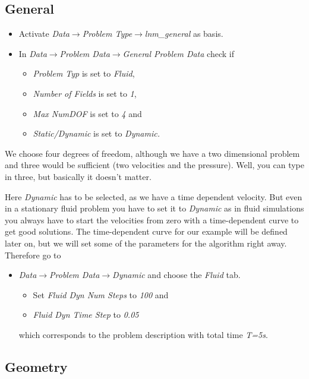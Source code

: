 \subsection{General}

\begin{itemize}
\item Activate \emph{Data$\to$Problem Type$\to$lnm\_general} as basis.
\item In \emph{Data$\to$Problem Data$\to$General Problem Data} check if 

\begin{itemize}
\item \emph{Problem Typ} is set to \emph{Fluid}, 
\item \emph{Number of Fields} is set to \emph{1}, 
\item \emph{Max NumDOF} is set to \emph{4} and 
\item \emph{Static/Dynamic} is set to \emph{Dynamic.}
\end{itemize}
\end{itemize}
We choose four degrees of freedom, although we have a two dimensional
problem and three would be sufficient (two velocities and the pressure).
Well, you can type in three, but basically it doesn't matter. 

Here \emph{Dynamic} has to be selected, as we have a time dependent
velocity. But even in a stationary fluid problem you have to set it
to \emph{Dynamic} as in fluid simulations you always have to start
the velocities from zero with a time-dependent curve to get good
solutions. The time-dependent curve for our example will be defined later on, 
but we will set some of the parameters for the algorithm right away. Therefore
go to 
\begin{itemize}
\item \emph{Data$\to$Problem Data$\to$Dynamic} and choose the \emph{Fluid} tab.
\begin{itemize}
\item Set \emph{Fluid Dyn Num Steps} to \emph{100} and 
\item \emph{Fluid Dyn Time Step} to \emph{0.05} 
\end {itemize}
which corresponds to the problem description with total time \emph{T=5s}. 
\end{itemize}


\subsection{Geometry}

